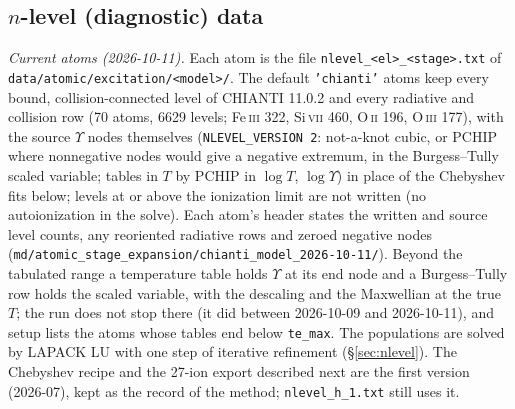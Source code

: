 \documentclass[english,a4paper]{my_memo}
\newcommand{\code}[1]{\texttt{#1}}
\begin{document}
\subsection{$n$-level (diagnostic) data}
\label{sec:nlev}
\begin{sloppypar}
\emph{Current atoms (2026-10-11).}  Each atom is the file
\code{nlevel\_<el>\_<stage>.txt} of \code{data/atomic/excitation/<model>/}.  The
default \code{'chianti'} atoms keep every bound, collision-connected level
of CHIANTI 11.0.2 and every radiative and collision row (70 atoms, 6629
levels; Fe\,\textsc{iii} 322, Si\,\textsc{vii} 460, O\,\textsc{ii} 196,
O\,\textsc{iii} 177), with the source $\Upsilon$ nodes themselves
(\code{NLEVEL\_VERSION 2}: not-a-knot cubic, or PCHIP where nonnegative
nodes would give a negative extremum, in the Burgess--Tully scaled
variable; tables in $T$ by PCHIP in $\log T$, $\log\Upsilon$) in place of
the Chebyshev fits below; levels at or above the ionization limit are not
written (no autoionization in the solve).  Each atom's header states the
written and source level counts, any reoriented radiative rows and zeroed
negative nodes (\code{md/atomic\_stage\_expansion/chianti\_model\_2026-10-11/}).
Beyond the tabulated range a temperature table holds $\Upsilon$ at its end
node and a Burgess--Tully row holds the scaled variable, with the descaling
and the Maxwellian at the true $T$; the run does not stop there (it did
between 2026-10-09 and 2026-10-11), and setup lists the atoms whose tables
end below \code{te\_max}.  The populations are solved by LAPACK LU with
one step of iterative refinement (\S\ref{sec:nlevel}).  The Chebyshev
recipe and the 27-ion export described next are the first version
(2026-07), kept as the record of the method; \code{nlevel\_h\_1.txt} still
uses it.
\end{sloppypar}
\end{document}
